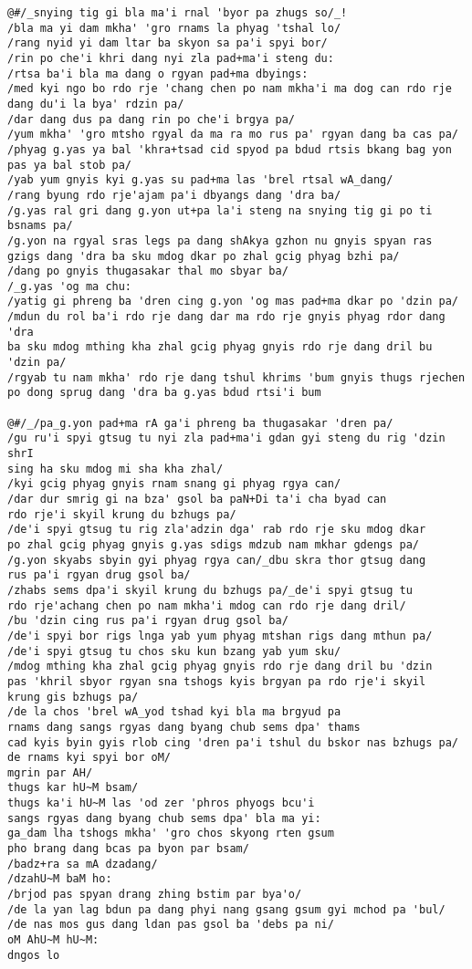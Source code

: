 \documentclass{article}
\begin{document}
\begin{verbatim}
@#/_snying tig gi bla ma'i rnal 'byor pa zhugs so/_!
/bla ma yi dam mkha' 'gro rnams la phyag 'tshal lo/
/rang nyid yi dam ltar ba skyon sa pa'i spyi bor/
/rin po che'i khri dang nyi zla pad+ma'i steng du:
/rtsa ba'i bla ma dang o rgyan pad+ma dbyings:
/med kyi ngo bo rdo rje 'chang chen po nam mkha'i ma dog can rdo rje
dang du'i la bya' rdzin pa/
/dar dang dus pa dang rin po che'i brgya pa/
/yum mkha' 'gro mtsho rgyal da ma ra mo rus pa' rgyan dang ba cas pa/
/phyag g.yas ya bal 'khra+tsad cid spyod pa bdud rtsis bkang bag yon
pas ya bal stob pa/
/yab yum gnyis kyi g.yas su pad+ma las 'brel rtsal wA_dang/
/rang byung rdo rje'ajam pa'i dbyangs dang 'dra ba/
/g.yas ral gri dang g.yon ut+pa la'i steng na snying tig gi po ti bsnams pa/
/g.yon na rgyal sras legs pa dang shAkya gzhon nu gnyis spyan ras
gzigs dang 'dra ba sku mdog dkar po zhal gcig phyag bzhi pa/
/dang po gnyis thugasakar thal mo sbyar ba/
/_g.yas 'og ma chu:
/yatig gi phreng ba 'dren cing g.yon 'og mas pad+ma dkar po 'dzin pa/
/mdun du rol ba'i rdo rje dang dar ma rdo rje gnyis phyag rdor dang 'dra
ba sku mdog mthing kha zhal gcig phyag gnyis rdo rje dang dril bu 'dzin pa/
/rgyab tu nam mkha' rdo rje dang tshul khrims 'bum gnyis thugs rjechen
po dong sprug dang 'dra ba g.yas bdud rtsi'i bum

@#/_/pa_g.yon pad+ma rA ga'i phreng ba thugasakar 'dren pa/
/gu ru'i spyi gtsug tu nyi zla pad+ma'i gdan gyi steng du rig 'dzin shrI
sing ha sku mdog mi sha kha zhal/
/kyi gcig phyag gnyis rnam snang gi phyag rgya can/
/dar dur smrig gi na bza' gsol ba paN+Di ta'i cha byad can
rdo rje'i skyil krung du bzhugs pa/
/de'i spyi gtsug tu rig zla'adzin dga' rab rdo rje sku mdog dkar
po zhal gcig phyag gnyis g.yas sdigs mdzub nam mkhar gdengs pa/
/g.yon skyabs sbyin gyi phyag rgya can/_dbu skra thor gtsug dang
rus pa'i rgyan drug gsol ba/
/zhabs sems dpa'i skyil krung du bzhugs pa/_de'i spyi gtsug tu
rdo rje'achang chen po nam mkha'i mdog can rdo rje dang dril/
/bu 'dzin cing rus pa'i rgyan drug gsol ba/
/de'i spyi bor rigs lnga yab yum phyag mtshan rigs dang mthun pa/
/de'i spyi gtsug tu chos sku kun bzang yab yum sku/
/mdog mthing kha zhal gcig phyag gnyis rdo rje dang dril bu 'dzin
pas 'khril sbyor rgyan sna tshogs kyis brgyan pa rdo rje'i skyil
krung gis bzhugs pa/
/de la chos 'brel wA_yod tshad kyi bla ma brgyud pa
rnams dang sangs rgyas dang byang chub sems dpa' thams
cad kyis byin gyis rlob cing 'dren pa'i tshul du bskor nas bzhugs pa/
de rnams kyi spyi bor oM/
mgrin par AH/
thugs kar hU~M bsam/
thugs ka'i hU~M las 'od zer 'phros phyogs bcu'i
sangs rgyas dang byang chub sems dpa' bla ma yi:
ga_dam lha tshogs mkha' 'gro chos skyong rten gsum
pho brang dang bcas pa byon par bsam/
/badz+ra sa mA dzadang/
/dzahU~M baM ho:
/brjod pas spyan drang zhing bstim par bya'o/
/de la yan lag bdun pa dang phyi nang gsang gsum gyi mchod pa 'bul/
/de nas mos gus dang ldan pas gsol ba 'debs pa ni/
oM AhU~M hU~M:
dngos lo


\end{verbatim}
\end{document}
